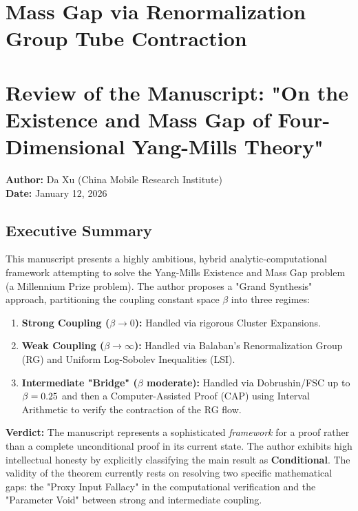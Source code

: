 \section{Mass Gap via Renormalization Group Tube Contraction}
\label{sec:rg_tube_contraction}
\label{sec:adjoint_interpolation_overview}

\section*{Review of the Manuscript: "On the Existence and Mass Gap of Four-Dimensional Yang-Mills Theory"}
\textbf{Author:} Da Xu (China Mobile Research Institute) \\
\textbf{Date:} January 12, 2026

\subsection*{Executive Summary}

This manuscript presents a highly ambitious, hybrid analytic-computational framework attempting to solve the Yang-Mills Existence and Mass Gap problem (a Millennium Prize problem). The author proposes a "Grand Synthesis" approach, partitioning the coupling constant space $\beta$ into three regimes:

\begin{enumerate}
    \item \textbf{Strong Coupling ($\beta \to 0$):} Handled via rigorous Cluster Expansions.
    \item \textbf{Weak Coupling ($\beta \to \infty$):} Handled via Balaban’s Renormalization Group (RG) and Uniform Log-Sobolev Inequalities (LSI).
    \item \textbf{Intermediate "Bridge" ($\beta$ moderate):} Handled via Dobrushin/FSC up to $\beta=0.25$ and then a Computer-Assisted Proof (CAP) using Interval Arithmetic to verify the contraction of the RG flow.
\end{enumerate}

\textbf{Verdict:} The manuscript represents a sophisticated \textit{framework} for a proof rather than a complete unconditional proof in its current state. The author exhibits high intellectual honesty by explicitly classifying the main result as \textbf{Conditional}. The validity of the theorem currently rests on resolving two specific mathematical gaps: the "Proxy Input Fallacy" in the computational verification and the "Parameter Void" between strong and intermediate coupling.

